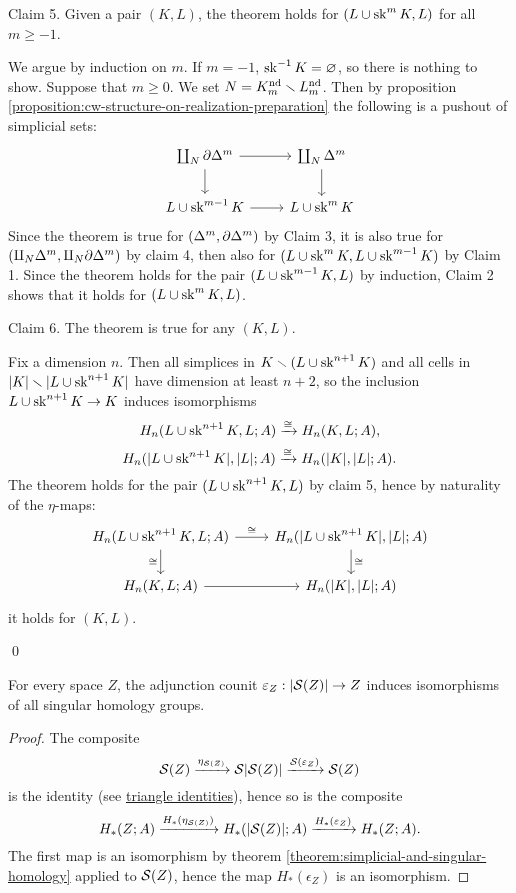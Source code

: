 

Claim 5. Given a pair $(K,L)$, the theorem holds for $(L\cup\sk^m K,L)$ for all $m\ge-1$.

\begin{claimproof}
We argue by induction on $m$. If $m=-1$, $\sk^\inv K=\emptyset$, so there is nothing to show. Suppose that $m\ge0$. We set $N=K^\text{nd}_m\sm L^\text{nd}_m$. Then by proposition \ref{proposition:cw-structure-on-realization-preparation} the following is a pushout of simplicial sets:
\[
\begin{tikzcd}
\coprod_N\de\Delta^m \ar[d] \ar[r] & \coprod_N\Delta^m \ar[d]\\
L\cup\sk^{m-1}K \ar[r] & L\cup\sk^mK
\end{tikzcd}
\]
Since the theorem is true for $(\Delta^m,\de\Delta^m)$ by Claim 3, it is also true for $(\amalg_N\Delta^m,\amalg_N\de\Delta^m)$ by claim 4, then also for $(L\cup\sk^m K,L\cup\sk^{m-1}K)$ by Claim 1. Since the theorem holds for the pair $(L\cup\sk^{m-1}K,L)$ by induction, Claim 2 shows that it holds for $(L\cup\sk^mK,L)$.
\end{claimproof}

Claim 6. The theorem is true for any $(K,L)$.

\begin{claimproof}
Fix a dimension $n$. Then all simplices in $K\sm(L\cup\sk^{n+1}K)$ and all cells in $|K|\sm|L\cup\sk^{n+1}K|$ have dimension at least $n+2$, so the inclusion $L\cup\sk^{n+1}K\to K$ induces isomorphisms
\[H_n(L\cup\sk^{n+1} K,L;A)\xto{\cong}H_n(K,L;A),\] \[H_n(|L\cup\sk^{n+1} K|,|L|;A)\xto{\cong}H_n(|K|,|L|;A).\]
The theorem holds for the pair $(L\cup\sk^{n+1}K,L)$ by claim 5, hence by naturality of the $\eta$-maps:
\[
\begin{tikzcd}
H_n(L\cup\sk^{n+1}K,L;A) \ar[d,"\cong"'] \ar[r,"\cong"] & H_n(|L\cup\sk^{n+1}K|,|L|;A) \ar[d,"\cong"]\\
H_n(K,L;A) \ar[r] & H_n(|K|,|L|;A)
\end{tikzcd}
\]
it holds for $(K,L)$.
\end{claimproof}\qed

\begin{corollary}\label{corollary:adjunction-counit-is-a-weak-equivalence}
For every space $Z$, the adjunction counit $\epsilon_Z:|\S(Z)|\to Z$ induces isomorphisms of all singular homology groups.
\end{corollary}

\begin{proof}
The composite
\[\S(Z)\xto{\eta_{\S(Z)}}\S|\S(Z)|\xto{\S(\epsilon_Z)}\S(Z)\]
is the identity (see \href{http://nlab-pages.s3.us-east-2.amazonaws.com/nlab/show/triangle+identities}{triangle identities}), hence so is the composite
\[H_*(Z;A)\xto{H_*(\eta_{\S(Z)})}H_*(|\S(Z)|;A)\xto{H_*(\epsilon_Z)}H_*(Z;A).\]
The first map is an isomorphism by theorem \ref{theorem:simplicial-and-singular-homology} applied to $\S(Z)$, hence the map $H_*(\epsilon_Z)$ is an isomorphism.
\end{proof}

